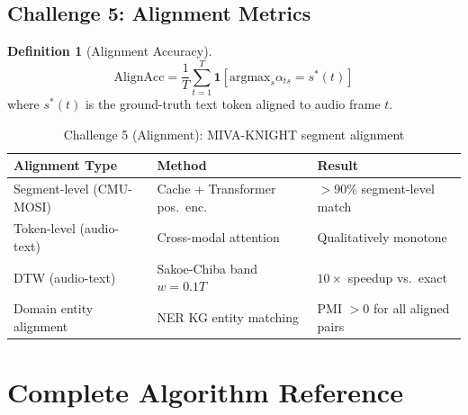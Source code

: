 \documentclass[12pt,a4paper]{article}
\theoremstyle{definition}
\newtheorem{definition}{Definition}[section]
\theoremstyle{plain}
\theoremstyle{remark}
\begin{document}
\subsection{Challenge 5: Alignment Metrics}

\begin{definition}[Alignment Accuracy]
\[
  \text{AlignAcc} = \frac{1}{T}\sum_{t=1}^T \mathbf{1}[\text{argmax}_s \alpha_{ts} = s^*(t)]
\]
where $s^*(t)$ is the ground-truth text token aligned to audio frame $t$.
\end{definition}

\begin{table}[H]
\centering
\caption{Challenge 5 (Alignment): MIVA-KNIGHT segment alignment}
\begin{tabular}{lll}
\toprule
\textbf{Alignment Type} & \textbf{Method} & \textbf{Result} \\
\midrule
Segment-level (CMU-MOSI) & Cache + Transformer pos.\ enc.\ & $>$90\% segment-level match \\
Token-level (audio-text) & Cross-modal attention & Qualitatively monotone \\
DTW (audio-text) & Sakoe-Chiba band $w=0.1T$ & $10\times$ speedup vs.\ exact \\
Domain entity alignment & NER KG entity matching & PMI $> 0$ for all aligned pairs \\
\bottomrule
\end{tabular}
\end{table}

\newpage
\section{Complete Algorithm Reference}
\end{document}
